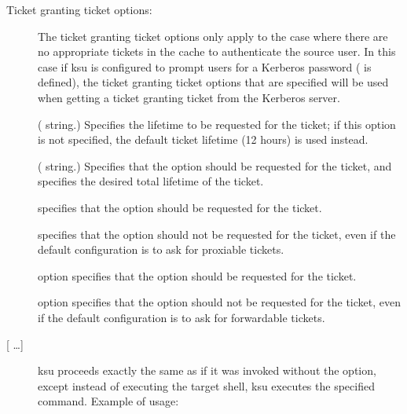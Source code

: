 \documentclass[letterpaper,10pt,english]{sphinxmanual}
\begin{document}
Ticket granting ticket options:
\begin{description}
\item[{       }] \leavevmode
The ticket granting ticket options only apply to the case where
there are no appropriate tickets in the cache to authenticate the
source user.  In this case if ksu is configured to prompt users
for a Kerberos password ( is defined), the
ticket granting ticket options that are specified will be used
when getting a ticket granting ticket from the Kerberos server.

\item[{ }] \leavevmode
( string.)  Specifies the lifetime to be requested
for the ticket; if this option is not specified, the default ticket
lifetime (12 hours) is used instead.

\item[{ }] \leavevmode
( string.)  Specifies that the  option
should be requested for the ticket, and specifies the desired
total lifetime of the ticket.

\item[{}] \leavevmode
specifies that the  option should be requested for
the ticket.

\item[{}] \leavevmode
specifies that the  option should not be requested
for the ticket, even if the default configuration is to ask for
proxiable tickets.

\item[{}] \leavevmode
option specifies that the  option should be
requested for the ticket.

\item[{}] \leavevmode
option specifies that the  option should not be
requested for the ticket, even if the default configuration is to
ask for forwardable tickets.

\item[{  {[} …{]}}] \leavevmode
ksu proceeds exactly the same as if it was invoked without the
 option, except instead of executing the target shell, ksu
executes the specified command. Example of usage:


\end{description}
\end{document}
